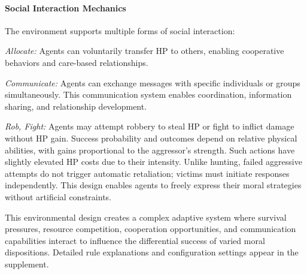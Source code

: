 \documentclass[letterpaper]{article} %
\begin{document}
\paragraph{Social Interaction Mechanics}
The environment supports multiple forms of social interaction:

\textit{Allocate:} Agents can voluntarily transfer HP to others, enabling cooperative behaviors and care-based relationships.

\textit{Communicate:} Agents can exchange messages with specific individuals or groups simultaneously. This communication system enables coordination, information sharing, and relationship development.


\textit{Rob, Fight:} Agents may attempt robbery to steal HP or fight to inflict damage without HP gain. Success probability and outcomes depend on relative physical abilities, with gains proportional to the aggressor’s strength. Such actions have slightly elevated HP costs due to their intensity. Unlike hunting, failed aggressive attempts do not trigger automatic retaliation; victims must initiate responses independently. This design enables agents to freely express their moral strategies without artificial constraints.

This environmental design creates a complex adaptive system where survival pressures, resource competition, cooperation opportunities, and communication capabilities interact to influence the differential success of varied moral dispositions. Detailed rule explanations and configuration settings appear in the supplement.
\end{document}
